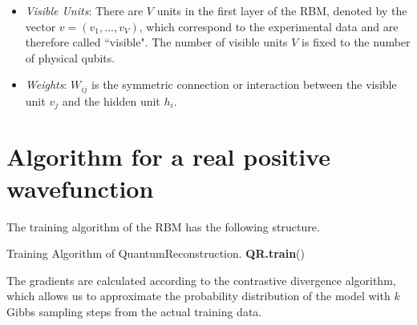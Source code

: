 \documentclass[submission, Phys]{SciPost}
\begin{document}
\begin{itemize}
	\item {\it Visible Units}: There are $V$ units in the first layer of the RBM, denoted by the vector $v=(v_1, ..., v_V)$, which correspond to the experimental data and are therefore called ``visible". The number of visible units $V$ is fixed to the number of physical qubits.

	\item {\it Weights}: $W_{ij}$ is the symmetric connection or interaction between the visible unit $v_j$ and the hidden unit $h_i$.

\end{itemize}



	\section{Algorithm for a real positive wavefunction}
	The training algorithm of the RBM has the following structure.

	\begin{algorithm}[H]
		\caption{Training Algorithm of QuantumReconstruction. \textbf{QR.train}() }
		\SetAlgoLined

	\end{algorithm}


	The gradients are calculated according to the contrastive divergence algorithm, which allows us to approximate the probability distribution of the model with $k$ Gibbs sampling steps from the actual training data.
\end{document}
